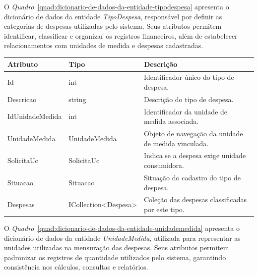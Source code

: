O \textit{Quadro}~\ref{quad:dicionario-de-dados-da-entidade-tipodespesa} apresenta o dicionário de dados da entidade \textit{TipoDespesa}, responsável por definir as categorias de despesas utilizadas pelo sistema. Seus atributos permitem identificar, classificar e organizar os registros financeiros, além de estabelecer relacionamentos com unidades de medida e despesas cadastradas.

\begin{quadro}[H]
\caption[Dicionário de dados da entidade TipoDespesa]{Dicionário de dados da entidade TipoDespesa}
\label{quad:dicionario-de-dados-da-entidade-tipodespesa}

\begin{tabular}{|p{}|p{}|p{}|}
\hline
\textbf{Atributo} & \textbf{Tipo} & \textbf{Descrição} \\ 
\hline
Id & int & Identificador único do tipo de despesa. \\ 
\hline
Descricao & string & Descrição do tipo de despesa. \\ 
\hline
IdUnidadeMedida & int & Identificador da unidade de medida associada. \\ 
\hline
UnidadeMedida & UnidadeMedida & Objeto de navegação da unidade de medida vinculada. \\ 
\hline
SolicitaUc & SolicitaUc & Indica se a despesa exige unidade consumidora. \\ 
\hline
Situacao & Situacao & Situação do cadastro do tipo de despesa. \\ 
\hline
Despesas & ICollection<Despesa> & Coleção das despesas classificadas por este tipo. \\ 
\hline
\end{tabular}


\end{quadro}



O \textit{Quadro}~\ref{quad:dicionario-de-dados-da-entidade-unidademedida} apresenta o dicionário de dados da entidade \textit{UnidadeMedida}, utilizada para representar as unidades utilizadas na mensuração das despesas. Seus atributos permitem padronizar os registros de quantidade utilizados pelo sistema, garantindo consistência nos cálculos, consultas e relatórios.

